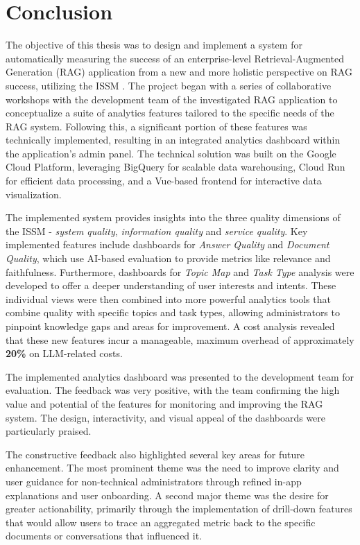 \documentclass[
	english,
	ruledheaders=section,%
	class=report,%
	thesis={type=bachelor},%
	accentcolor=1b,%
	custommargins=true,%
	marginpar=false,%
	parskip=half-,%
	fontsize=11pt,%
	DIV=14,
]{tudapub}
\begin{document}
\chapter{Conclusion}
The objective of this thesis was to design and implement a system for automatically measuring the success of an enterprise-level Retrieval-Augmented Generation (RAG) application from a new and more holistic perspective on RAG success, utilizing the ISSM \parencite{DeloneMcLean2003ISSuccessTenYearUpdate}. The project began with a series of collaborative workshops with the development team of the investigated RAG application to conceptualize a suite of analytics features tailored to the specific needs of the RAG system. Following this, a significant portion of these features was technically implemented, resulting in an integrated analytics dashboard within the application's admin panel. The technical solution was built on the Google Cloud Platform, leveraging BigQuery for scalable data warehousing, Cloud Run for efficient data processing, and a Vue-based frontend for interactive data visualization.

The implemented system provides insights into the three quality dimensions of the ISSM \parencite{DeloneMcLean2003ISSuccessTenYearUpdate} - \textit{system quality}, \textit{information quality} and \textit{service quality}. Key implemented features include dashboards for \textit{Answer Quality} and \textit{Document Quality}, which use AI-based evaluation to provide metrics like relevance and faithfulness. Furthermore, dashboards for \textit{Topic Map} and \textit{Task Type} analysis were developed to offer a deeper understanding of user interests and intents. These individual views were then combined into more powerful analytics tools that combine quality with specific topics and task types, allowing administrators to pinpoint knowledge gaps and areas for improvement. A cost analysis revealed that these new features incur a manageable, maximum overhead of approximately \textbf{20\%} on LLM-related costs.

The implemented analytics dashboard was presented to the development team for evaluation. The feedback was very positive, with the team confirming the high value and potential of the features for monitoring and improving the RAG system. The design, interactivity, and visual appeal of the dashboards were particularly praised.

The constructive feedback also highlighted several key areas for future enhancement. The most prominent theme was the need to improve clarity and user guidance for non-technical administrators through refined in-app explanations and user onboarding. A second major theme was the desire for greater actionability, primarily through the implementation of drill-down features that would allow users to trace an aggregated metric back to the specific documents or conversations that influenced it.
\end{document}
